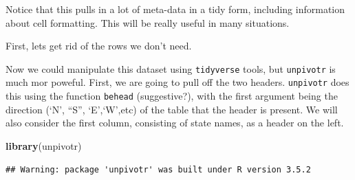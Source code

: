 \documentclass[12pt,letterpaperpaper,openany]{book}
\newenvironment{Shaded}{\begin{snugshade}}{\end{snugshade}}
\newcommand{\DecValTok}[1]{\textcolor[rgb]{0.00,0.00,0.81}{#1}}
\newcommand{\KeywordTok}[1]{\textcolor[rgb]{0.13,0.29,0.53}{\textbf{#1}}}
\newcommand{\NormalTok}[1]{#1}
\newcommand{\OperatorTok}[1]{\textcolor[rgb]{0.81,0.36,0.00}{\textbf{#1}}}
\newcommand{\StringTok}[1]{\textcolor[rgb]{0.31,0.60,0.02}{#1}}
\begin{document}
Notice that this pulls in a lot of meta-data in a tidy form, including information
about cell formatting. This will be really useful in many situations.

First, lets get rid of the rows we don't need.

\begin{Shaded}
\end{Shaded}

Now we could manipulate this dataset using \texttt{tidyverse} tools, but \texttt{unpivotr} is much mor poweful.
First, we are going to pull off the two headers. \texttt{unpivotr} does this using the function \texttt{behead} (suggestive?),
with the first argument being the direction (`N', ``S'', `E',`W',etc) of the table that the header is present. We will
also consider the first column, consisting of state names, as a header on the left.

\begin{Shaded}
\begin{Highlighting}[]
\KeywordTok{library}\NormalTok{(unpivotr)}
\end{Highlighting}
\end{Shaded}

\begin{verbatim}
## Warning: package 'unpivotr' was built under R version 3.5.2
\end{verbatim}

\begin{Shaded}
\end{Shaded}
\end{document}
